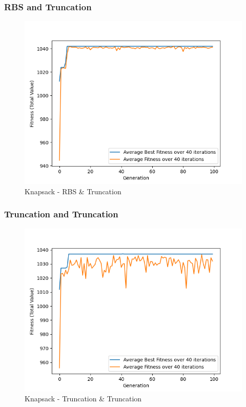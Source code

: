\documentclass[11pt, letterpaper]{article}
\begin{document}
\subsubsection {RBS and Truncation}
\begin{figure}[h]
    \centering
    \includegraphics[scale = 0.6]{images/knapsack_rb_tr.png}
    \caption {Knapsack - RBS \& Truncation}
    \label {fig:kpBT}
\end{figure}

\subsubsection {Truncation and Truncation}
\begin{figure}[H]
    \centering
    \includegraphics[scale = 0.6]{images/knapsack_tr_tr.png}
    \caption {Knapsack - Truncation \& Truncation}
    \label {fig:kpTT}
\end{figure}
\end{document}
